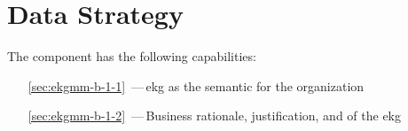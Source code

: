 \chapter{Data Strategy}\label{ch:ekg-mm-b-1}\label{ch:ekg-mm-data-strategy} %

The  component has the following capabilities:

\begin{itemize}[leftmargin=.5in]
    \item [\ref{sec:ekgmm-b-1-1}] \,---\,\gls{ekg} as the semantic  for the organization
    \item [\ref{sec:ekgmm-b-1-2}] \,---\,Business rationale, justification, and  of the \gls{ekg}
\end{itemize}


